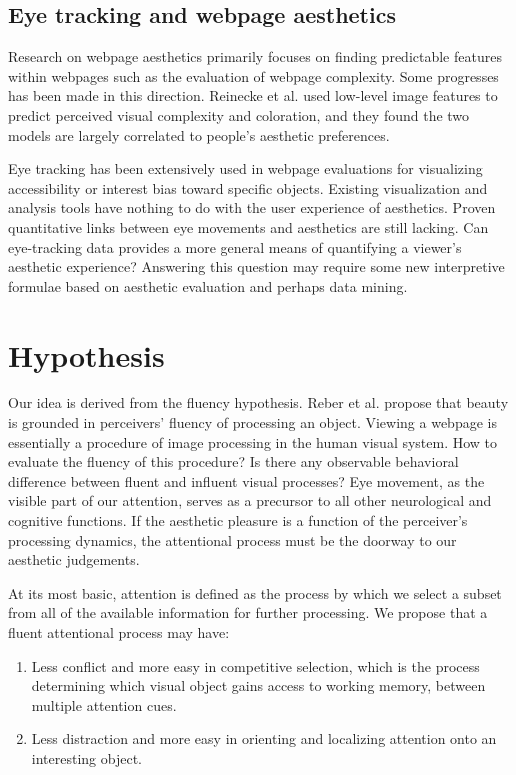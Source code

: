 \subsection{Eye tracking and webpage aesthetics}
Research on webpage aesthetics primarily focuses on finding predictable features within webpages such as the evaluation of webpage complexity\cite{Deng2010}.
Some progresses has been made in this direction\cite{Ivory}\cite{Zheng}.
Reinecke et al.\cite{Reinecke} used low-level image features to predict perceived visual complexity and coloration, and they found the two models are largely correlated to people's aesthetic preferences.

Eye tracking has been extensively used in webpage evaluations for visualizing accessibility or interest bias toward specific objects.
Existing visualization and analysis tools have nothing to do with the user experience of aesthetics.
Proven quantitative links between eye movements and aesthetics are still lacking\cite{Santella}.
Can eye-tracking data provides a more general means of quantifying a viewer's aesthetic experience?
Answering this question may require some new interpretive formulae based on aesthetic evaluation and perhaps data mining.

\section{Hypothesis}
\label{sec:hyp}
Our idea is derived from the fluency hypothesis.
Reber et al.\cite{Reber2004} propose that beauty is grounded in perceivers' fluency of processing an object.
Viewing a webpage is essentially a procedure of image processing in the human visual system.
How to evaluate the fluency of this procedure?
Is there any observable behavioral difference between fluent and influent visual processes?
Eye movement, as the visible part of our attention, serves as a precursor to all other neurological and cognitive functions.
If the aesthetic pleasure is a function of the perceiver's processing dynamics\cite{Reber2004}, the attentional process must be the doorway to our aesthetic judgements.

At its most basic, attention is defined as the process by which we select a subset from all of the available information for further processing\cite{Eriksen1972}.
We propose that a fluent attentional process may have:
\begin{enumerate}
  \item Less conflict and more easy in competitive selection, which is the process determining which visual object gains access to working memory, between multiple attention cues.
  \item Less distraction and more easy in orienting and localizing attention onto an interesting object.
\end{enumerate}

